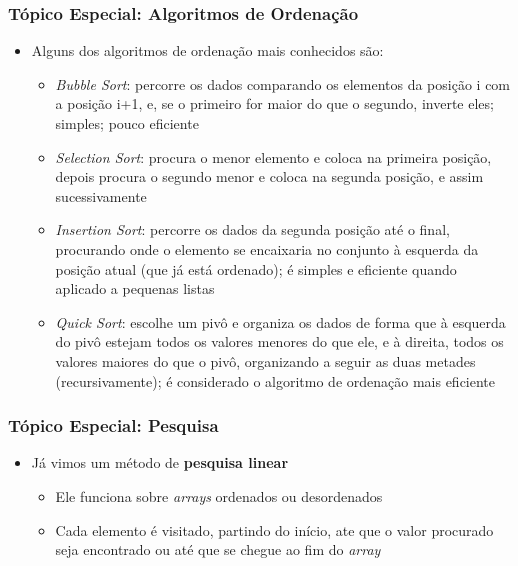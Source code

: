 \documentclass[xcolor={dvipsnames,table},aspectratio=169]{beamer}
\begin{document}
\begin{frame}\frametitle{Tópico Especial: Algoritmos de Ordenação}
\begin{itemize}
	\item Alguns dos algoritmos de ordenação mais conhecidos são:
	\begin{itemize}
		\item \emph{Bubble Sort}: percorre os dados comparando os elementos da posição i com a posição i+1, e, se o primeiro for maior do que o segundo, inverte eles; simples; pouco eficiente
		\item \emph{Selection Sort}: procura o menor elemento e coloca na primeira posição, depois procura o segundo menor e coloca na segunda posição, e assim sucessivamente
		\item \emph{Insertion Sort}: percorre os dados da segunda posição até o final, procurando onde o elemento se encaixaria no conjunto à esquerda da posição atual (que já está ordenado); é simples e eficiente quando aplicado a pequenas listas
		\item \emph{Quick Sort}: escolhe um pivô e organiza os dados de forma que à esquerda do pivô estejam todos os valores menores do que ele, e à direita, todos os valores maiores do que o pivô, organizando a seguir as duas metades (recursivamente); é considerado o algoritmo de ordenação mais eficiente
	\end{itemize}
\end{itemize}
\end{frame}

\begin{frame}\frametitle{Tópico Especial: Pesquisa}
\begin{itemize}
	\item Já vimos um método de \textbf{pesquisa linear}
	\begin{itemize}
		\item Ele funciona sobre \emph{arrays} ordenados ou desordenados
		\item Cada elemento é visitado, partindo do início, ate que o valor procurado seja encontrado ou até que se chegue ao fim do \emph{array}
	\end{itemize}
\end{itemize}
\end{frame}
\end{document}
